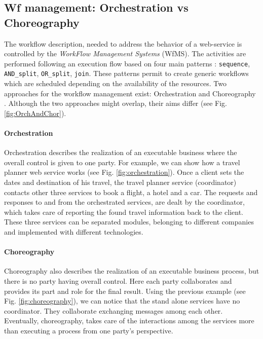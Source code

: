 \subsection{Wf management: Orchestration vs Choreography}
\label{WFManagement}
The workflow description, needed to address the behavior of a web-service is controlled by the \textit{WorkFlow Management Systems} (WfMS). The activities are performed following an execution flow based on four main patterns \cite{Pernici04}: \verb|sequence|, \verb|AND_split|, \verb|OR_split|, \verb|join|. These patterns permit to create generic workflows which are scheduled depending on the availability of the resources.
Two approaches for the workflow management exist: Orchestration and Choreography \cite{Peltz03}. Although the two approaches might overlap, their aims differ (see Fig. \ref{fig:OrchAndChor}). 

\paragraph{Orchestration}
Orchestration describes the realization of an executable business where the overall control is given to one party. For example, we can show how a travel planner web service works (see Fig. \ref{fig:orchestration}). Once a client sets the dates and destination of his travel, the travel planner service (coordinator) contacts other three services to book a flight, a hotel and a car. The requests and responses to and from the orchestrated services, are dealt by the coordinator, which takes care of reporting the found travel information back to the client.
These three services can be separated modules, belonging to different companies and implemented with different technologies.
\paragraph{Choreography}
Choreography also describes the realization of an executable business process, but there is no party having overall control. Here each party collaborates and provides its part and role for the final result. Using the previous example (see Fig. \ref{fig:choreography}), we can notice that the stand alone services have no coordinator. They collaborate exchanging messages among each other. Eventually, choreography, takes care of the interactions among the services more than executing a process from one party's perspective.

